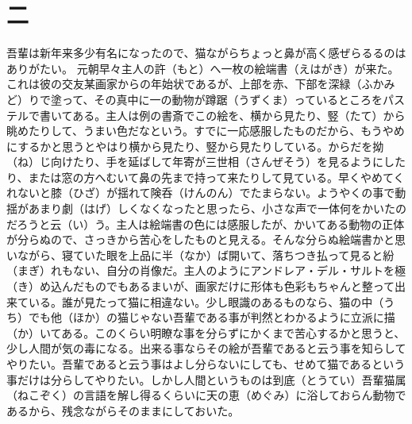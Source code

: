 \documentclass{book}
\begin{document}
\chapter*{二}
吾輩は新年来多少有名になったので、猫ながらちょっと鼻が高く感ぜらるるのはありがたい。
元朝早々主人の許（もと）へ一枚の絵端書（えはがき）が来た。これは彼の交友某画家からの年始状であるが、上部を赤、下部を深緑（ふかみど）りで塗って、その真中に一の動物が蹲踞（うずくま）っているところをパステルで書いてある。主人は例の書斎でこの絵を、横から見たり、竪（たて）から眺めたりして、うまい色だなという。すでに一応感服したものだから、もうやめにするかと思うとやはり横から見たり、竪から見たりしている。からだを拗（ね）じ向けたり、手を延ばして年寄が三世相（さんぜそう）を見るようにしたり、または窓の方へむいて鼻の先まで持って来たりして見ている。早くやめてくれないと膝（ひざ）が揺れて険呑（けんのん）でたまらない。ようやくの事で動揺があまり劇（はげ）しくなくなったと思ったら、小さな声で一体何をかいたのだろうと云（い）う。主人は絵端書の色には感服したが、かいてある動物の正体が分らぬので、さっきから苦心をしたものと見える。そんな分らぬ絵端書かと思いながら、寝ていた眼を上品に半（なか）ば開いて、落ちつき払って見ると紛（まぎ）れもない、自分の肖像だ。主人のようにアンドレア・デル・サルトを極（き）め込んだものでもあるまいが、画家だけに形体も色彩もちゃんと整って出来ている。誰が見たって猫に相違ない。少し眼識のあるものなら、猫の中（うち）でも他（ほか）の猫じゃない吾輩である事が判然とわかるように立派に描（か）いてある。このくらい明瞭な事を分らずにかくまで苦心するかと思うと、少し人間が気の毒になる。出来る事ならその絵が吾輩であると云う事を知らしてやりたい。吾輩であると云う事はよし分らないにしても、せめて猫であるという事だけは分らしてやりたい。しかし人間というものは到底（とうてい）吾輩猫属（ねこぞく）の言語を解し得るくらいに天の恵（めぐみ）に浴しておらん動物であるから、残念ながらそのままにしておいた。
\end{document}
